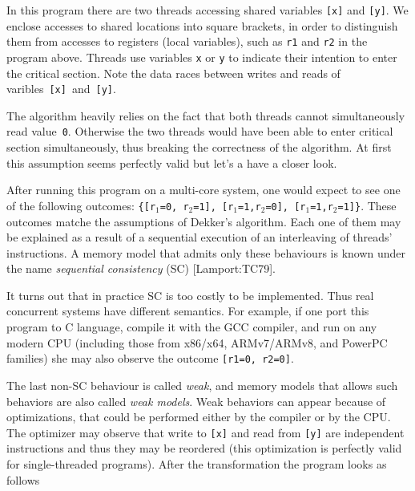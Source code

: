 \documentclass[a4paper,twoside,11pt]{article}
\numberwithin{equation}{section}
\begin{document}
In this program there are two threads accessing shared variables \texttt{[x]} and \texttt{[y]}.
We enclose accesses to shared locations into square brackets, 
in order to distinguish them from accesses to registers (local variables), 
such as \texttt{r1} and \texttt{r2} in the program above.
Threads use variables \texttt{x} or \texttt{y} to indicate 
their intention to enter the critical section.
Note the data races between writes and reads of varibles~\texttt{[x]}~and~\texttt{[y]}.

The algorithm heavily relies on the fact that both threads 
cannot simultaneously read value~\texttt{0}.
Otherwise the two threads would have been able to enter critical section simultaneously, 
thus breaking the correctness of the algorithm.
At first this assumption seems perfectly valid but let's a have a closer look.

After running this program on a multi-core system, one would expect to see 
one of the following outcomes: \texttt{\{[r$_1$=0, r$_2$=1], [r$_1$=1,r$_2$=0], [r$_1$=1,r$_2$=1]\}}.
These outcomes matche the assumptions of Dekker's algorithm.
Each one of them may be explained as a result of a sequential execution of an interleaving of threads' instructions. 
A memory model that admits only these behaviours is known under the name \emph{sequential consistency} (SC) [Lamport:TC79].


It turns out that in practice SC is too costly to be implemented.
Thus real concurrent systems have different semantics. 
For example, if one port this program to C language, compile it with the GCC compiler, 
and run on any modern CPU (including those from x86/x64, ARMv7/ARMv8, and PowerPC families)
she may also observe the outcome \texttt{[r1=0, r2=0]}.

The last non-SC behaviour is called \emph{weak},
and memory models that allows such behaviors are also called \emph{weak models}.
Weak behaviors can appear because of optimizations,
that could be performed either by the compiler or by the CPU. 
The optimizer may observe that write to \texttt{[x]} and read from \texttt{[y]}
are independent instructions and thus they may be reordered
(this optimization is perfectly valid for single-threaded programs).
After the transformation the program looks as follows
\end{document}
